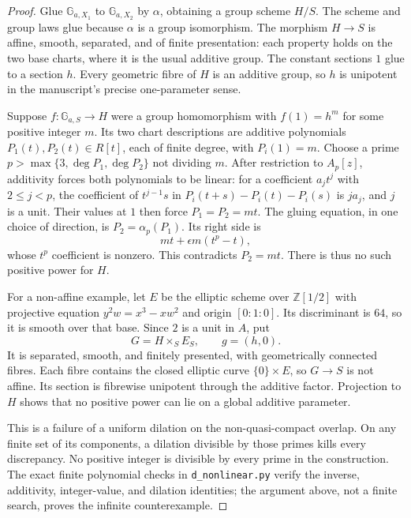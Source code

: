 \begin{proof}
Glue $\mathbb G_{a,X_1}$ to $\mathbb G_{a,X_2}$ by $\alpha$, obtaining
a group scheme $H/S$. The scheme and group laws glue because $\alpha$
is a group isomorphism. The morphism $H\to S$ is affine, smooth,
separated, and of finite presentation: each property holds on the
two base charts, where it is the usual additive group. The constant
sections $1$ glue to a section $h$. Every geometric fibre of $H$ is
an additive group, so $h$ is unipotent in the manuscript's precise
one-parameter sense.

Suppose $f:\mathbb G_{a,S}\to H$ were a group homomorphism with
$f(1)=h^m$ for some positive integer $m$. Its two chart descriptions
are additive polynomials $P_1(t),P_2(t)\in R[t]$, each of finite
degree, with $P_i(1)=m$. Choose a prime
$p>\max\{3,\deg P_1,\deg P_2\}$ not dividing $m$. After restriction
to $A_p[z]$, additivity forces both polynomials to be linear:
for a coefficient $a_jt^j$ with $2\le j<p$, the coefficient of
$t^{j-1}s$ in $P_i(t+s)-P_i(t)-P_i(s)$ is $ja_j$, and $j$ is a unit.
Their values at $1$ then force $P_1=P_2=mt$. The gluing equation,
in one choice of direction, is $P_2=\alpha_p(P_1)$. Its right side is
\[
                        mt+\epsilon m(t^p-t),
\]
whose $t^p$ coefficient is nonzero. This contradicts $P_2=mt$.
There is thus no such positive power for $H$.

For a non-affine example, let $E$ be the elliptic scheme over
$\mathbb Z[1/2]$ with projective equation
$y^2w=x^3-xw^2$ and origin $[0:1:0]$. Its discriminant is $64$,
so it is smooth over that base. Since $2$ is a unit in $A$, put
\[
                         G=H\times_SE_S,\qquad g=(h,0).
\]
It is separated, smooth, and finitely presented, with geometrically
connected fibres. Each fibre contains the closed elliptic curve
$\{0\}\times E$, so $G\to S$ is not affine. Its section is fibrewise
unipotent through the additive factor. Projection to $H$ shows that
no positive power can lie on a global additive parameter.

This is a failure of a uniform dilation on the non-quasi-compact
overlap. On any finite set of its components, a dilation divisible
by those primes kills every discrepancy. No positive integer is
divisible by every prime in the construction. The exact finite
polynomial checks in \texttt{d\_nonlinear.py} verify the inverse,
additivity, integer-value, and dilation identities; the argument
above, not a finite search, proves the infinite counterexample.
\end{proof}

